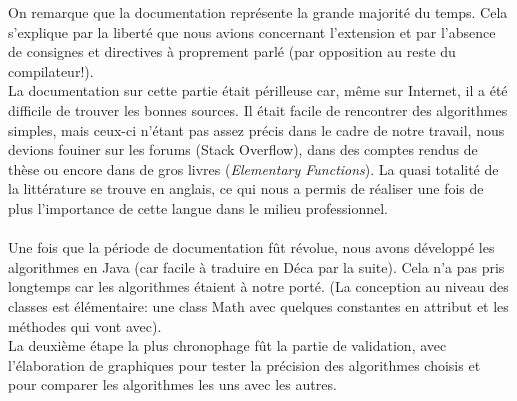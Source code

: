 \documentclass{article}
\begin{document}
\newpage
On remarque que la documentation représente la grande majorité du temps. Cela s'explique par la liberté que nous avions concernant
l'extension et par l'absence de consignes et directives à proprement parlé (par opposition au reste du compilateur!). \\
La documentation sur cette partie était périlleuse car, même sur Internet, il a été difficile de trouver les bonnes sources. Il était facile
de rencontrer des algorithmes simples, mais ceux-ci n'étant pas assez précis dans le cadre de notre travail, nous devions fouiner sur les
forums (Stack Overflow), dans des comptes rendus de thèse ou encore dans de gros livres (\textit{Elementary Functions}). La quasi totalité de
la littérature se trouve en anglais, ce qui nous a permis de réaliser une fois de plus l'importance de cette langue dans le milieu
professionnel. \\
\\
Une fois que la période de documentation fût révolue, nous avons développé les algorithmes en Java (car facile à traduire en Déca par la suite).
Cela n'a pas pris longtemps car les algorithmes étaient à notre porté. (La conception au niveau des classes est élémentaire: une class Math
avec quelques constantes en attribut et les méthodes qui vont avec). \\
La deuxième étape la plus chronophage fût la partie de validation, avec l'élaboration de graphiques pour tester la précision des algorithmes
choisis et pour comparer les algorithmes les uns avec les autres.

\newpage
\end{document}
